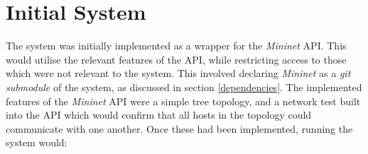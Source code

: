 













%
%
%
%
%
%
%
%
%

\section{Initial System}
\label{initial_system}
The system was initially implemented as a wrapper for the \textit{Mininet} API.
This would utilise the relevant features of the API, while restricting access to those which were not relevant to the system.
This involved declaring \textit{Mininet} as a \textit{git submodule} of the system, as discussed in section \ref{dependencies}.
The implemented features of the \textit{Mininet} API were a simple tree topology, and a network test built into the API which would confirm that all hosts in the topology could communicate with one another.
Once these had been implemented, running the system would:

